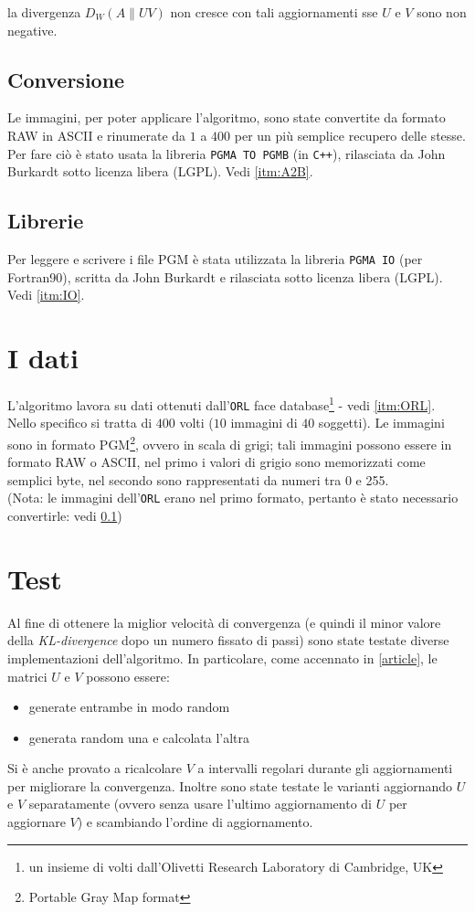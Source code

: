 \documentclass[a4paper]{article} %
\begin{document}
la divergenza $D_W(A\lVert UV)$ non cresce con tali aggiornamenti sse $U$ e $V$ sono non negative.

\subsection{Conversione}\label{subsec:conversione}
Le immagini, per poter applicare l'algoritmo, sono state convertite da formato RAW in ASCII e rinumerate da $1$ a $400$ per un più semplice recupero delle stesse. Per fare ciò è stato usata la libreria \texttt{PGMA TO PGMB} 
(in \texttt{C++}), rilasciata da John Burkardt sotto licenza libera (LGPL).
Vedi \ref{itm:A2B}.

\subsection{Librerie} 
Per leggere e scrivere i file PGM è stata utilizzata la libreria \texttt{PGMA IO} (per Fortran90), scritta da John Burkardt e rilasciata sotto licenza libera (LGPL).
Vedi \ref{itm:IO}.

\section{I dati}
L'algoritmo lavora su dati ottenuti dall'\texttt{ORL} face database\footnote{un insieme di volti dall'Olivetti Research Laboratory di Cambridge, UK} - vedi \ref{itm:ORL}.
Nello specifico si tratta di $400$ volti ($10$ immagini di $40$ soggetti). Le immagini sono in formato PGM\footnote{Portable Gray Map format}, ovvero in scala di grigi; tali immagini possono essere in formato RAW o ASCII, nel primo i valori di grigio sono memorizzati come semplici byte, nel secondo sono rappresentati da numeri tra 0 e 255. \\ 
(Nota: le immagini dell'\texttt{ORL} erano nel primo formato, pertanto è stato necessario convertirle: vedi \ref{subsec:conversione})

\section{Test}
Al fine di ottenere la miglior velocità di convergenza (e quindi il minor valore della \emph{KL-divergence} dopo un numero fissato di passi) sono state testate diverse implementazioni dell'algoritmo. In particolare, come accennato in \ref{article}, le matrici $U$ e $V$ possono essere:
\begin{itemize}
\item generate entrambe in modo random
\item generata random una e calcolata l'altra
\end{itemize}
Si è anche provato a ricalcolare $V$ a intervalli regolari durante gli aggiornamenti per migliorare la convergenza.
Inoltre sono state testate le varianti aggiornando $U$ e $V$ separatamente (ovvero senza usare l'ultimo aggiornamento di $U$ per aggiornare $V$) e scambiando l'ordine di aggiornamento.
\end{document}
